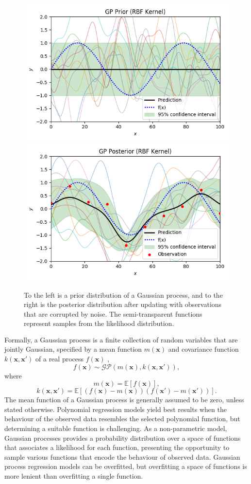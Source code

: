 \documentclass[ %
author={Dillon Keith Diep},
supervisor={Dr. Carl Henrik Ek},
degree={MEng},
title={ART-CG Hair:},
subtitle={Assisted Real-time Content Generation of Stylised Virtual Hair},
type={Research},
year={2017} ]{dissertation}
\begin{document}
\begin{figure}[!h]
	\centering
	\includegraphics[scale=0.5]{images/gpPrior}
	\includegraphics[scale=0.5]{images/gpPosterior}
	\caption{To the left is a prior distribution of a Gaussian process, and to the right is the posterior distribution after updating with observations that are corrupted by noise. The semi-transparent functions represent samples from the likelihood distribution.}
	\label{gpnoisy}
\end{figure}

Formally, a Gaussian process is a finite collection of random variables that are jointly Gaussian, specified by a mean function $m(\bm{x})$ and covariance function $k(\bm{x},\bm{x'})$ of a real process $f(\bm{x})$ \cite[p.13]{gp},
$$f(\bm{x})\sim\mathcal{GP}(m(\bm{x}), k(\bm{x}, \bm{x'})),$$
where
$$m(\bm{x})=\mathbb{E}[f(\bm{x})],$$
$$k(\bm{x},\bm{x'})=\mathbb{E}[(f(\bm{x})-m(\bm{x}))(f(\bm{x'})-m(\bm{x'}))].$$
The mean function of a Gaussian process is generally assumed to be zero, unless stated otherwise.
Polynomial regression models yield best results when the behaviour of the observed data resembles the selected polynomial function, but determining a suitable function is challenging. As a non-parametric model, Gaussian processes provides a probability distribution over a space of functions that associates a likelihood for each function, presenting the opportunity to sample various functions that encode the behaviour of observed data. Gaussian process regression models can be overfitted, but overfitting a space of functions is more lenient than overfitting a single function.
\end{document}
